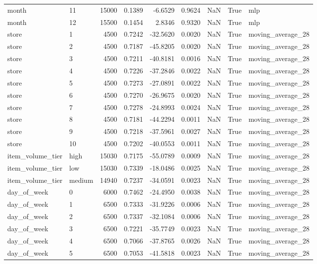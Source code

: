 \begin{table}
\begin{tabular}{llrrrrrrl}
month & 11 & 15000 & 0.1389 & -6.6529 & 0.9624 & NaN & True & mlp \\
month & 12 & 15500 & 0.1454 & 2.8346 & 0.9320 & NaN & True & mlp \\
store & 1 & 4500 & 0.7242 & -32.5620 & 0.0020 & NaN & True & moving\_average\_28 \\
store & 2 & 4500 & 0.7187 & -45.8205 & 0.0020 & NaN & True & moving\_average\_28 \\
store & 3 & 4500 & 0.7211 & -40.8181 & 0.0016 & NaN & True & moving\_average\_28 \\
store & 4 & 4500 & 0.7226 & -37.2846 & 0.0022 & NaN & True & moving\_average\_28 \\
store & 5 & 4500 & 0.7273 & -27.0891 & 0.0022 & NaN & True & moving\_average\_28 \\
store & 6 & 4500 & 0.7270 & -26.9675 & 0.0020 & NaN & True & moving\_average\_28 \\
store & 7 & 4500 & 0.7278 & -24.8993 & 0.0024 & NaN & True & moving\_average\_28 \\
store & 8 & 4500 & 0.7181 & -44.2294 & 0.0011 & NaN & True & moving\_average\_28 \\
store & 9 & 4500 & 0.7218 & -37.5961 & 0.0027 & NaN & True & moving\_average\_28 \\
store & 10 & 4500 & 0.7202 & -40.0553 & 0.0011 & NaN & True & moving\_average\_28 \\
item\_volume\_tier & high & 15030 & 0.7175 & -55.0789 & 0.0009 & NaN & True & moving\_average\_28 \\
item\_volume\_tier & low & 15030 & 0.7339 & -18.0486 & 0.0025 & NaN & True & moving\_average\_28 \\
item\_volume\_tier & medium & 14940 & 0.7237 & -34.0591 & 0.0023 & NaN & True & moving\_average\_28 \\
day\_of\_week & 0 & 6000 & 0.7462 & -24.4950 & 0.0038 & NaN & True & moving\_average\_28 \\
day\_of\_week & 1 & 6500 & 0.7333 & -31.9226 & 0.0006 & NaN & True & moving\_average\_28 \\
day\_of\_week & 2 & 6500 & 0.7337 & -32.1084 & 0.0006 & NaN & True & moving\_average\_28 \\
day\_of\_week & 3 & 6500 & 0.7221 & -35.7749 & 0.0023 & NaN & True & moving\_average\_28 \\
day\_of\_week & 4 & 6500 & 0.7066 & -37.8765 & 0.0026 & NaN & True & moving\_average\_28 \\
day\_of\_week & 5 & 6500 & 0.7053 & -41.5818 & 0.0023 & NaN & True & moving\_average\_28 \\

\end{tabular}
\end{table}
